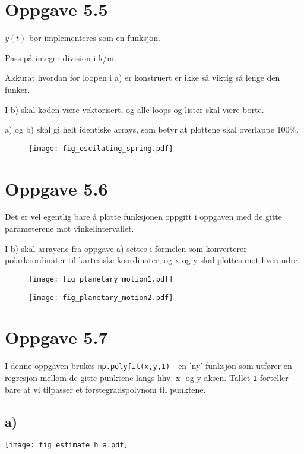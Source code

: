 \documentclass[10pt,a4paper]{article}
\begin{document}
\newpage
\section*{Oppgave 5.5}
$y(t)$ bør implementeres som en funksjon.

Pass på integer division i k/m.

Akkurat hvordan for loopen i a) er konstruert er ikke så viktig så lenge den funker.

I b) skal koden være vektorisert, og alle loops og lister skal være borte.

a) og b) skal gi helt identiske arrays, som betyr at plottene skal overlappe 100\%.



\begin{figure}[H]
\centering
\texttt{[image: fig\_oscilating\_spring.pdf]}
\end{figure}


\newpage
\section*{Oppgave 5.6}
Det er vel egentlig bare å plotte funksjonen oppgitt i oppgaven med de gitte parameterene mot vinkelintervallet.

I b) skal arrayene fra oppgave a) settes i formelen som konverterer polarkoordinater til kartesiske koordinater, og x og y skal plottes mot hverandre.


\begin{figure}[H]
\centering
\texttt{[image: fig\_planetary\_motion1.pdf]}
\end{figure}

\begin{figure}[H]
\centering
\texttt{[image: fig\_planetary\_motion2.pdf]}
\end{figure}

\pagebreak
\section*{Oppgave 5.7}
I denne oppgaven brukes \texttt{np.polyfit(x,y,1)} - en 'ny' funksjon som utfører en regresjon mellom de gitte punktene langs hhv. x- og y-aksen. Tallet \texttt{1} forteller bare at vi tilpasser et førstegradspolynom til punktene. 

\subsection*{a)}
\texttt{[image: fig\_estimate\_h\_a.pdf]}
\end{document}
